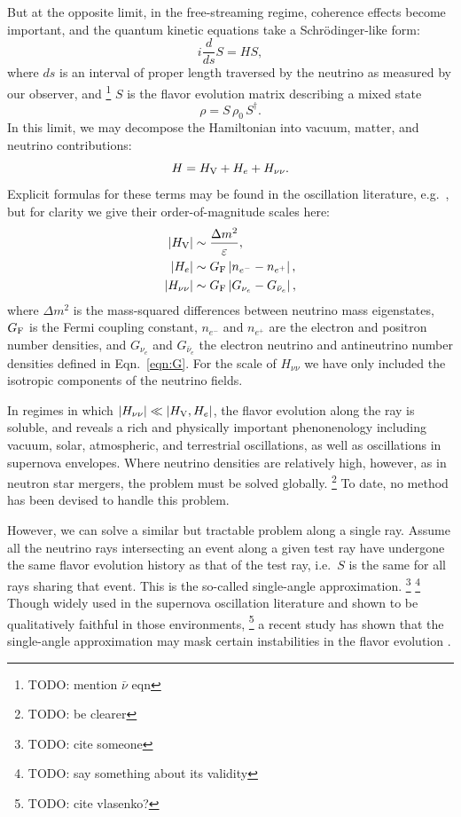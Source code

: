 \documentclass[aps,floatfix,prd,superscriptaddress,twocolumn]{revtex4-1}
\begin{document}
But at the opposite limit, in the free-streaming regime,
coherence effects become important,
and the quantum kinetic equations take a Schr\"{o}dinger-like form:
\begin{equation}
  \label{eqn:schroedinger}
  i \frac{d}{ds} S = H S,
\end{equation}
where $ds$ is an interval of proper length traversed by the neutrino as
measured by our observer, and
\footnote{TODO: mention $\bar{\nu}$ eqn}
$S$ is the flavor evolution matrix describing a mixed state
\begin{equation}
  \label{eq:density_evolution}
  \rho = S \, \rho_0 \, S^\dagger.
\end{equation}
In this limit, we may decompose the Hamiltonian into vacuum,
matter, and neutrino contributions:
\begin{equation}
  \label{eqn:decompose_H}
  H = H_{\rm V} + H_e + H_{\nu\nu}.
\end{equation}
Explicit formulas for these terms may be found in the oscillation literature,
e.g.\ \cite{duan2009-review},
but for clarity we give their order-of-magnitude scales here:
\begin{align}
  \label{eqn:scale_H_V}
  |H_{\rm V}| &\sim \frac{\Delta m^2}{\varepsilon}, \\
  \label{eqn:scale_H_e}
  |H_e|       &\sim G_{\rm F}\left|n_{e^-}-n_{e^+}\right|, \\
  \label{eqn:scale_H_nunu}
  |H_{\nu\nu}|&\sim G_{\rm F} \left|G_{\nu_e}-G_{\bar{\nu}_e}\right|,
\end{align}
where $\Delta m^2$ is the mass-squared differences between neutrino mass
eigenstates,
$G_{\rm F}$ is the Fermi coupling constant,
$n_{e^-}$ and $n_{e^+}$ are the electron and positron number densities,
and $G_{\nu_e}$ and $G_{\bar{\nu}_e}$ the electron neutrino and antineutrino
number densities defined in Eqn.~\ref{eqn:G}.
For the scale of $H_{\nu\nu}$ we have only included the isotropic
components of the neutrino fields.

In regimes in which $|H_{\nu\nu}|\ll|H_{\rm V},H_e|$,
the flavor evolution along the ray is soluble, and reveals a rich
and physically important phenonenology including
vacuum, solar, atmospheric, and terrestrial oscillations,
as well as oscillations in supernova envelopes.
Where neutrino densities are relatively high, however,
as in neutron star mergers, the problem must be solved globally.
\footnote{TODO: be clearer}
To date, no method has been devised to handle this problem.

However, we can solve a similar but tractable problem along a single ray.
Assume all the neutrino rays intersecting an event along a given test ray
have undergone the same flavor evolution history as that of the test ray,
i.e.\ $S$ is the same for all rays sharing that event.
This is the so-called single-angle approximation.
\footnote{TODO: cite someone}
\footnote{TODO: say something about its validity}
Though widely used in the supernova oscillation literature
and shown to be qualitatively faithful in those environments,
\footnote{TODO: cite vlasenko?}
a recent study has shown that the single-angle approximation
may mask certain instabilities in the flavor evolution
\cite{wu2017-fast_neutrino_conversions}.
\end{document}
